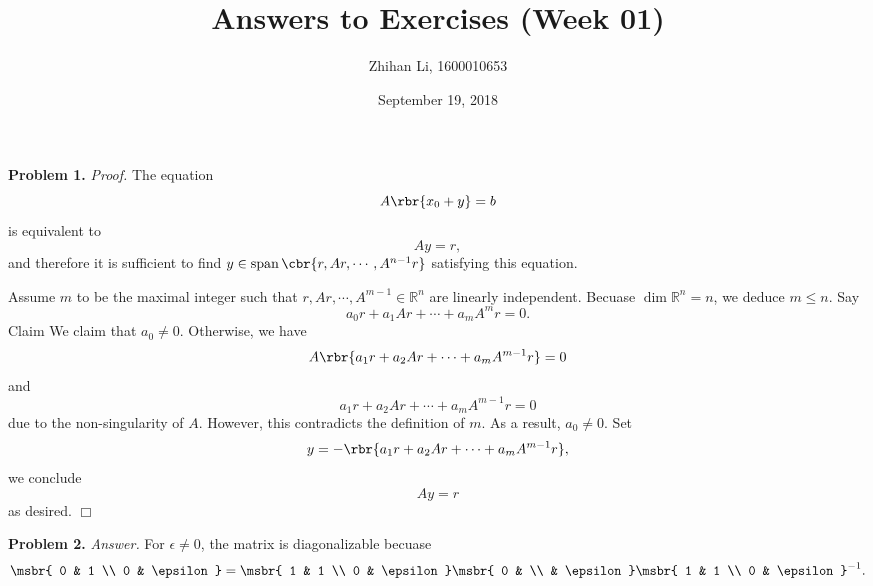 \documentclass[english, nochinese]{pnote}
\title{Answers to Exercises (Week 01)}
\author{Zhihan Li, 1600010653}
\date{September 19, 2018}
\begin{document}
\maketitle

\textbf{Problem 1.} \textit{Proof.} The equation
\begin{equation}
A \rbr{ x_0 + y } = b
\end{equation}
is equivalent to
\begin{equation}
A y = r,
\end{equation}
and therefore it is sufficient to find $ y \in \mathop{\text{span}} \cbr{ r, A r, \cdots, A^{ n - 1 } r } $ satisfying this equation.

Assume $m$ to be the maximal integer such that $ r, A r, \cdots, A^{ m - 1 } \in \mathbb{R}^n $ are linearly independent. Becuase $ \dim \mathbb{R}^n = n $, we deduce $ m \le n $. Say
\begin{equation}
a_0 r + a_1 A r + \cdots + a_m A^m r = 0.
\end{equation}Claim
We claim that $ a_0 \neq 0 $. Otherwise, we have
\begin{equation}
A \rbr{ a_1 r + a_2 A r + \cdots + a_m A^{ m - 1 } r } = 0
\end{equation}
and
\begin{equation}
a_1 r + a_2 A r + \cdots + a_m A^{ m - 1 } r = 0
\end{equation}
due to the non-singularity of $A$. However, this contradicts the definition of $m$. As a result, $ a_0 \neq 0 $. Set
\begin{equation}
y = - \rbr{ a_1 r + a_2 A r + \cdots + a_m A^{ m - 1 } r },
\end{equation}
we conclude
\begin{equation}
A y = r
\end{equation}
as desired.
\hfill$\Box$

\textbf{Problem 2.} \textit{Answer.} For $ \epsilon \neq 0 $, the matrix is diagonalizable becuase
\begin{equation}
\msbr{ 0 & 1 \\ 0 & \epsilon } = \msbr{ 1 & 1 \\ 0 & \epsilon } \msbr{ 0 & \\ & \epsilon } \msbr{ 1 & 1 \\ 0 & \epsilon }^{-1}.
\end{equation}
\end{document}

